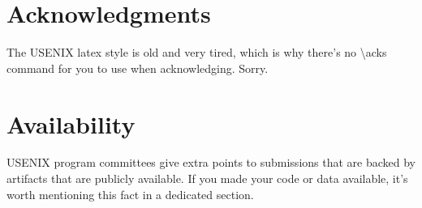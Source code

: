 \section*{Acknowledgments}

The USENIX latex style is old and very tired, which is why
there's no \textbackslash{}acks command for you to use when
acknowledging. Sorry.

\section*{Availability}

USENIX program committees give extra points to submissions that are
backed by artifacts that are publicly available. If you made your code
or data available, it's worth mentioning this fact in a dedicated
section.






